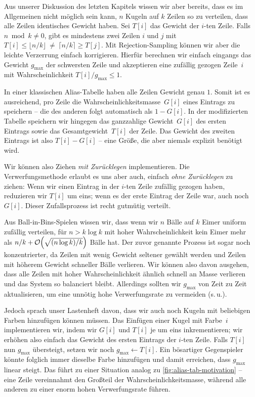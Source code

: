 Aus unserer Diskussion des letzten Kapitels wissen wir aber bereits, dass es im Allgemeinen nicht möglich sein kann, $n$ Kugeln auf $k$ Zeilen so zu verteilen, dass alle Zeilen identisches Gewicht haben.
Sei $T[i]$ das Gewicht der $i$-ten Zeile.
Falls $n \bmod k \ne 0$, gibt es mindestens zwei Zeilen $i$ und $j$ mit  $T[i] \le \lfloor n / k \rfloor\ \ne\ \lceil n / k \rceil \ge T[j]$.
Mit Rejection-Sampling können wir aber die leichte Verzerrung einfach korrigieren.
Hierfür berechnen wir einfach eingangs das Gewicht $g_{\text{max}}$ der schwersten Zeile und akzeptieren eine zufällig gezogen Zeile~$i$ mit Wahrscheinlichkeit $T[i] / g_{\text{max}} \le 1$.

In einer klassischen Alias-Tabelle haben alle Zeilen Gewicht genau $1$.
Somit ist es ausreichend, pro Zeile die Wahrscheinlichkeitsmasse~$G[i]$ eines Eintrags zu speichern -- die des anderen folgt automatisch als $1 - G[i]$.
In der modifizierten Tabelle speichern wir hingegen das ganzzahlige Gewicht~$G[i]$ des ersten Eintrags sowie das Gesamtgewicht~$T[i]$ der Zeile.
Das Gewicht des zweiten Eintrags ist also $T[i] - G[i]$ -- eine Größe, die aber niemals explizit benötigt wird.

Wir können also Ziehen \emph{mit Zurücklegen} implementieren.
Die Verwerfungsmethode erlaubt es uns aber auch, einfach \emph{ohne Zurücklegen} zu ziehen:
Wenn wir einen Eintrag in der $i$-ten Zeile zufällig gezogen haben, reduzieren wir $T[i]$ um eins;
wenn es der erste Eintrag der Zeile war, auch noch $G[i]$.
Dieser Zufallsprozess ist recht gutmütig verteilt.

Aus Ball-in-Bins-Spielen wissen wir, dass wenn wir $n$ Bälle auf $k$ Eimer uniform zufällig verteilen, für $n > k \log k$ mit hoher Wahrscheinlichkeit kein Eimer mehr als $n/k +\mathcal{O}\!\left(\sqrt{(n\log k) / k}\right)$ Bälle hat.
Der zuvor genannte Prozess ist sogar noch konzentrierter, da Zeilen mit wenig Gewicht seltener gewählt werden und Zeilen mit höherem Gewicht schneller Bälle verlieren.
Wir können also davon ausgehen, dass alle Zeilen mit hoher Wahrscheinlichkeit ähnlich schnell an Masse verlieren und das System so balanciert bleibt.
Allerdings sollten wir $g_{\text{max}}$ von Zeit zu Zeit aktualisieren, um eine unnötig hohe Verwerfungsrate zu vermeiden (s.\,u.).

Jedoch sprach unser Lastenheft davon, dass wir auch noch Kugeln mit beliebigen Farben hinzufügen können müssen.
Das Einfügen einer Kugel mit Farbe~$i$ implementieren wir, indem wir $G[i]$ und $T[i]$ je um eins inkrementieren;
wir erhöhen also einfach das Gewicht des ersten Eintrags der $i$-ten Zeile.
Falls $T[i]$ nun $g_{\text{max}}$ übersteigt, setzen wir noch $g_{\text{max}} \gets T[i]$.
Ein bösartiger Gegenspieler könnte folglich immer dieselbe Farbe hinzufügen und damit erreichen, dass $g_{\text{max}}$ linear steigt.
Das führt zu einer Situation analog zu \cref{fig:alias-tab-motivation}
-- eine Zeile vereinnahmt den Großteil der Wahrscheinlichkeitsmasse, während alle anderen zu einer enorm hohen Verwerfungsrate führen.

